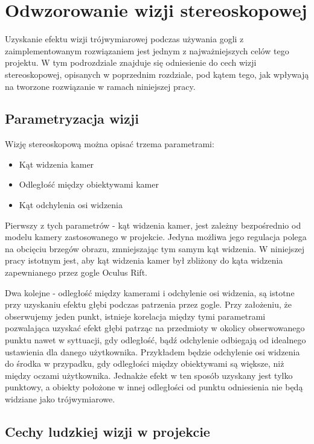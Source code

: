\documentclass[a4paper,11pt,twoside]{report}
\theoremstyle{definition}
\begin{document}
\section{Odwzorowanie wizji stereoskopowej}

Uzyskanie efektu wizji trójwymiarowej podczas używania gogli z zaimplementowanym rozwiązaniem jest jednym z najważniejszych celów tego projektu. W tym podrozdziale znajduje się odniesienie do cech wizji stereoskopowej, opisanych w poprzednim rozdziale, pod kątem tego, jak wpływają na tworzone rozwiązanie w ramach niniejszej pracy. 

\pagebreak
\subsection{Parametryzacja wizji}

Wizję stereoskopową można opisać trzema parametrami:

\begin{itemize}
\item Kąt widzenia kamer
\item Odległość między obiektywami kamer
\item Kąt odchylenia osi widzenia
\end{itemize}

Pierwszy z tych parametrów - kąt widzenia kamer, jest zależny bezpośrednio od modelu kamery zastosowanego w projekcie. Jedyna możliwa jego regulacja polega na obcięciu brzegów obrazu, zmniejszając tym samym kąt widzenia. W niniejszej pracy istotnym jest, aby kąt widzenia kamer był zbliżony do kąta widzenia zapewnianego przez gogle Oculus Rift.

Dwa kolejne - odległość między kamerami i odchylenie osi widzenia, są istotne przy uzyskaniu efektu głębi podczas patrzenia przez gogle. Przy założeniu, że obserwujemy jeden punkt, istnieje korelacja między tymi parametrami pozwalająca uzyskać efekt głębi patrząc na przedmioty w okolicy obserwowanego punktu nawet w syttuacji, gdy odległość, bądź odchylenie odbiegają od idealnego ustawienia dla danego użytkownika. Przykładem będzie odchylenie osi widzenia do środka w przypadku, gdy odległości między obiektywami są większe, niż między oczami użytkownika. Jednakże efekt w ten sposób uzyskany jest tylko punktowy, a obiekty położone w innej odległości od punktu odniesienia nie będą widziane jako trójwymiarowe.

\subsection{Cechy ludzkiej wizji w projekcie}
\end{document}
